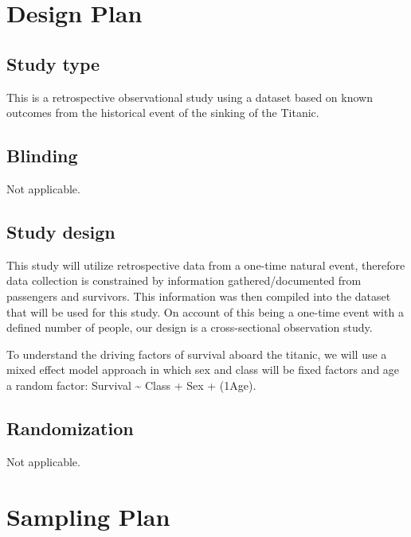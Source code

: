 \documentclass[]{article}
\begin{document}
\hypertarget{design-plan}{%
\section{Design Plan}\label{design-plan}}

\hypertarget{study-type}{%
\subsection{Study type}\label{study-type}}

This is a retrospective observational study using a dataset based on
known outcomes from the historical event of the sinking of the Titanic.

\hypertarget{blinding}{%
\subsection{Blinding}\label{blinding}}

Not applicable.

\hypertarget{study-design}{%
\subsection{Study design}\label{study-design}}

This study will utilize retrospective data from a one-time natural
event, therefore data collection is constrained by information
gathered/documented from passengers and survivors. This information was
then compiled into the dataset that will be used for this study. On
account of this being a one-time event with a defined number of people,
our design is a cross-sectional observation study.

To understand the driving factors of survival aboard the titanic, we
will use a mixed effect model approach in which sex and class will be
fixed factors and age a random factor: Survival \textasciitilde{} Class
+ Sex + (1\textbar Age).

\hypertarget{randomization}{%
\subsection{Randomization}\label{randomization}}

Not applicable.

\hypertarget{sampling-plan}{%
\section{Sampling Plan}\label{sampling-plan}}
\end{document}
